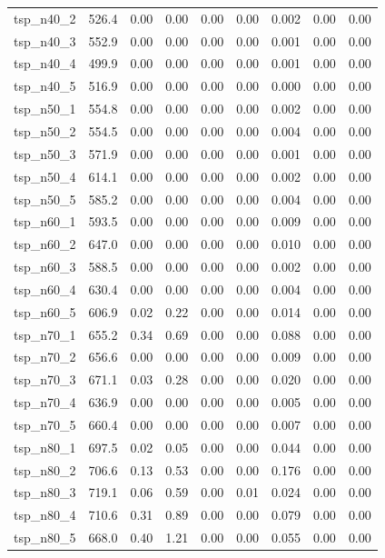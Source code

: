 \begin{longtable}{lrrrrrrrr}
tsp\_n40\_2 & 526.4 & 0.00 & 0.00 & 0.00 & 0.00 & 0.002 & 0.00 & 0.00 \\
tsp\_n40\_3 & 552.9 & 0.00 & 0.00 & 0.00 & 0.00 & 0.001 & 0.00 & 0.00 \\
tsp\_n40\_4 & 499.9 & 0.00 & 0.00 & 0.00 & 0.00 & 0.001 & 0.00 & 0.00 \\
tsp\_n40\_5 & 516.9 & 0.00 & 0.00 & 0.00 & 0.00 & 0.000 & 0.00 & 0.00 \\
tsp\_n50\_1 & 554.8 & 0.00 & 0.00 & 0.00 & 0.00 & 0.002 & 0.00 & 0.00 \\
tsp\_n50\_2 & 554.5 & 0.00 & 0.00 & 0.00 & 0.00 & 0.004 & 0.00 & 0.00 \\
tsp\_n50\_3 & 571.9 & 0.00 & 0.00 & 0.00 & 0.00 & 0.001 & 0.00 & 0.00 \\
tsp\_n50\_4 & 614.1 & 0.00 & 0.00 & 0.00 & 0.00 & 0.002 & 0.00 & 0.00 \\
tsp\_n50\_5 & 585.2 & 0.00 & 0.00 & 0.00 & 0.00 & 0.004 & 0.00 & 0.00 \\
tsp\_n60\_1 & 593.5 & 0.00 & 0.00 & 0.00 & 0.00 & 0.009 & 0.00 & 0.00 \\
tsp\_n60\_2 & 647.0 & 0.00 & 0.00 & 0.00 & 0.00 & 0.010 & 0.00 & 0.00 \\
tsp\_n60\_3 & 588.5 & 0.00 & 0.00 & 0.00 & 0.00 & 0.002 & 0.00 & 0.00 \\
tsp\_n60\_4 & 630.4 & 0.00 & 0.00 & 0.00 & 0.00 & 0.004 & 0.00 & 0.00 \\
tsp\_n60\_5 & 606.9 & 0.02 & 0.22 & 0.00 & 0.00 & 0.014 & 0.00 & 0.00 \\
tsp\_n70\_1 & 655.2 & 0.34 & 0.69 & 0.00 & 0.00 & 0.088 & 0.00 & 0.00 \\
tsp\_n70\_2 & 656.6 & 0.00 & 0.00 & 0.00 & 0.00 & 0.009 & 0.00 & 0.00 \\
tsp\_n70\_3 & 671.1 & 0.03 & 0.28 & 0.00 & 0.00 & 0.020 & 0.00 & 0.00 \\
tsp\_n70\_4 & 636.9 & 0.00 & 0.00 & 0.00 & 0.00 & 0.005 & 0.00 & 0.00 \\
tsp\_n70\_5 & 660.4 & 0.00 & 0.00 & 0.00 & 0.00 & 0.007 & 0.00 & 0.00 \\
tsp\_n80\_1 & 697.5 & 0.02 & 0.05 & 0.00 & 0.00 & 0.044 & 0.00 & 0.00 \\
tsp\_n80\_2 & 706.6 & 0.13 & 0.53 & 0.00 & 0.00 & 0.176 & 0.00 & 0.00 \\
tsp\_n80\_3 & 719.1 & 0.06 & 0.59 & 0.00 & 0.01 & 0.024 & 0.00 & 0.00 \\
tsp\_n80\_4 & 710.6 & 0.31 & 0.89 & 0.00 & 0.00 & 0.079 & 0.00 & 0.00 \\
tsp\_n80\_5 & 668.0 & 0.40 & 1.21 & 0.00 & 0.00 & 0.055 & 0.00 & 0.00 \\

\end{longtable}
